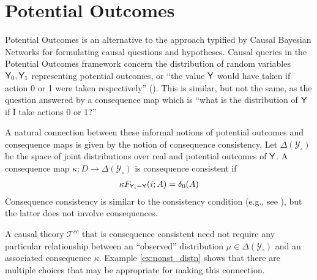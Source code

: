 
\section{Potential Outcomes}

Potential Outcomes is an alternative to the approach typified by Causal Bayesian Networks for formulating causal questions and hypotheses. Causal queries in the Potential Outcomes framework concern the distribution of random variables $\mathsf{Y}_0, \mathsf{Y}_1$ representing potential outcomes, or ``the value $\mathsf{Y}$ would have taken if action 0 or 1 were taken respectively'' (\cite{angrist_mastering_2014}). This is similar, but not the same, as the question answered by a consequence map which is ``what is the distribution of $\mathsf{Y}$ if I take actions 0 or 1?''

A natural connection between these informal notions of potential outcomes and consequence maps is given by the notion of consequence consistency. Let $\Delta(\mathcal{Y}_\circ)$ be the space of joint distributions over real and potential outcomes of $\mathsf{Y}$. A consequence map $\kappa:D\to \Delta(\mathcal{Y}_\circ)$ is consequence consistent if
\begin{align}
    \kappa F_{\mathsf{Y}_i-\mathsf{Y}} (i;A)=\delta_0(A) \label{eq:oc_consist}
\end{align} 
Consequence consistency is similar to the consistency condition (e.g., see \cite{richardson2013single}), but the latter does not involve consequences.

A causal theory $\mathscr{T}^{cc}$ that is consequence consistent need not require any particular relationship between an ``observed'' distribution $\mu\in \Delta(\mathcal{Y}_\circ)$ and an associated consequence $\kappa$. Example \ref{ex:nonst_distn} shows that there are multiple choices that may be appropriate for making this connection.

